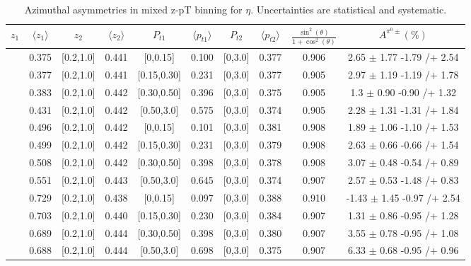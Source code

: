 \begin{table}[H]\scriptsize
\centering
\begin{tabular}{|c| c| c| c| c| c| c| c| c| c|}
\hline
$z_1$& $\langle  z_{1}  \rangle$ & $z_2$ & $\langle  z_{2}\rangle$& $P_{t1}$ & $\langle  p_{t1} \rangle$& $P_{t2}$ &  $\langle p_{t2}\rangle$ &$\frac{\sin^2(\theta)}{1+\cos^2(\theta)}$& $A^{\pi^0\pm}(\%)$   \\ \hline
[0.3,0.5]	&	0.375	&	[0.2,1.0]	&	0.441	&	[0,0.15]	&	0.100	&	[0,3.0]	&	0.377	&	0.906	&	2.65	$\pm$ 	1.77	-1.79	/+	2.54	\\ \hline
[0.3,0.5]	&	0.377	&	[0.2,1.0]	&	0.441	&	[0.15,0.30]	&	0.231	&	[0,3.0]	&	0.377	&	0.905	&	2.97	$\pm$ 	1.19	-1.19	/+	1.78	\\ \hline
[0.3,0.5]	&	0.383	&	[0.2,1.0]	&	0.442	&	[0.30,0.50]	&	0.396	&	[0,3.0]	&	0.375	&	0.905	&	1.3	$\pm$ 	0.90	-0.90	/+	1.32	\\ \hline
[0.3,0.5]	&	0.431	&	[0.2,1.0]	&	0.442	&	[0.50,3.0]	&	0.575	&	[0,3.0]	&	0.374	&	0.905	&	2.28	$\pm$ 	1.31	-1.31	/+	1.84	\\ \hline
[0.5,0.7]	&	0.496	&	[0.2,1.0]	&	0.442	&	[0,0.15]	&	0.101	&	[0,3.0]	&	0.381	&	0.908	&	1.89	$\pm$ 	1.06	-1.10	/+	1.53	\\ \hline
[0.5,0.7]	&	0.499	&	[0.2,1.0]	&	0.442	&	[0.15,0.30]	&	0.231	&	[0,3.0]	&	0.379	&	0.908	&	2.63	$\pm$ 	0.66	-0.66	/+	1.54	\\ \hline
[0.5,0.7]	&	0.508	&	[0.2,1.0]	&	0.442	&	[0.30,0.50]	&	0.398	&	[0,3.0]	&	0.378	&	0.908	&	3.07	$\pm$ 	0.48	-0.54	/+	0.89	\\ \hline
[0.5,0.7]	&	0.551	&	[0.2,1.0]	&	0.443	&	[0.50,3.0]	&	0.645	&	[0,3.0]	&	0.374	&	0.907	&	2.57	$\pm$ 	0.53	-1.48	/+	0.83	\\ \hline
[0.7,1.0]	&	0.729	&	[0.2,1.0]	&	0.438	&	[0,0.15]	&	0.097	&	[0,3.0]	&	0.388	&	0.910	&	-1.43	$\pm$ 	1.45	-0.97	/+	2.54	\\ \hline
[0.7,1.0]	&	0.703	&	[0.2,1.0]	&	0.440	&	[0.15,0.30]	&	0.230	&	[0,3.0]	&	0.384	&	0.907	&	1.31	$\pm$ 	0.86	-0.95	/+	1.28	\\ \hline
[0.7,1.0]	&	0.689	&	[0.2,1.0]	&	0.444	&	[0.30,0.50]	&	0.398	&	[0,3.0]	&	0.380	&	0.907	&	3.55	$\pm$ 	0.78	-0.95	/+	1.08	\\ \hline
[0.7,1.0]	&	0.688	&	[0.2,1.0]	&	0.444	&	[0.50,3.0]	&	0.698	&	[0,3.0]	&	0.375	&	0.907	&	6.33	$\pm$ 	0.68	-0.95	/+	0.96	\\ \hline
\end{tabular}
\caption{Azimuthal asymmetries in mixed z-pT binning for $\eta$. Uncertainties are statistical and systematic.}
\label{tab:finaletaptbins}
\end{table}

